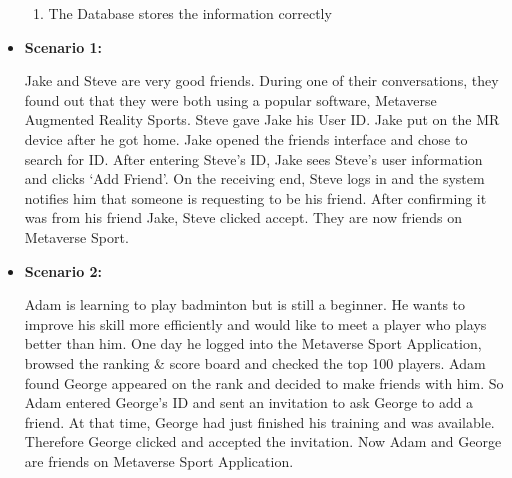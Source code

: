 \documentclass[a4paper]{article}
\begin{document}
\begin{itemize}
\begin{enumerate}[itemindent=1em]
			\item The Database stores the information correctly
		\end{enumerate}
		\item[] \textbf{Scenario 1:}
		\par \hspace*{1cm} Jake and Steve are very good friends. During one of their conversations, they found out that they were both using a popular software, Metaverse Augmented Reality Sports. Steve gave Jake his User ID. Jake put on the MR device after he got home. Jake opened the friends interface and chose to search for ID. After entering Steve's ID, Jake sees Steve's user information and clicks `Add Friend'. On the receiving end, Steve logs in and the system notifies him that someone is requesting to be his friend. After confirming it was from his friend Jake, Steve clicked accept. They are now friends on Metaverse Sport.
		\item[] \textbf{Scenario 2:}
		\par \hspace*{1cm} Adam is learning to play badminton but is still a beginner. He wants to improve his skill more efficiently and would like to meet a player who plays better than him. One day he logged into the Metaverse Sport Application, browsed the ranking \& score board and checked the top 100 players. Adam found George appeared on the rank and decided to make friends with him. So Adam entered George's ID and sent an invitation to ask George to add a friend. At that time, George had just finished his training and was available. Therefore George clicked and accepted the invitation. Now Adam and George are friends on Metaverse Sport Application. 
	\end{itemize}

	\hspace*{\fill}\\
\end{document}
